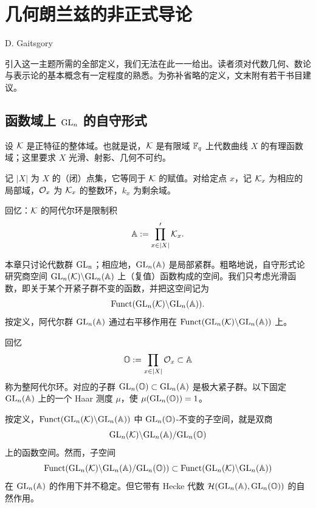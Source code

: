 \chapter{几何朗兰兹的非正式导论}\label{ch:12}

\begin{center}
D. Gaitsgory
\end{center}

\renewcommand{\thesection}{\arabic{section}}
\begingroup\let\thefootnote\relax{}\endgroup


引入这一主题所需的全部定义，我们无法在此一一给出。读者须对代数几何、数论与表示论的基本概念有一定程度的熟悉。为弥补省略的定义，文末附有若干书目建议。

\section{函数域上 $\mathrm{GL}_n$ 的自守形式}

设 $\mathcal{K}$ 是正特征的整体域。也就是说，$\mathcal{K}$ 是有限域 $\mathbb{F}_q$ 上代数曲线 $X$ 的有理函数域；这里要求 $X$ 光滑、射影、几何不可约。

记 $|X|$ 为 $X$ 的（闭）点集，它等同于 $\mathcal{K}$ 的赋值。对给定点 $x$，记 $\mathcal{K}_x$ 为相应的局部域，$\mathcal{O}_x$ 为 $\mathcal{K}_x$ 的整数环，$k_x$ 为剩余域。

回忆：$\mathcal{K}$ 的阿代尔环是限制积
\[
\mathbb{A}:=\prod_{x\in|X|}'\mathcal{K}_x .
\]

本章只讨论代数群 $\mathrm{GL}_n$；相应地，$\mathrm{GL}_n(\mathbb{A})$ 是局部紧群。粗略地说，自守形式论研究商空间 $\mathrm{GL}_n(\mathcal{K})\backslash\allowbreak\mathrm{GL}_n(\mathbb{A})$ 上（复值）函数构成的空间。我们只考虑光滑函数，即关于某个开紧子群不变的函数，并把这空间记为
\[
\operatorname{Funct}(\mathrm{GL}_n(\mathcal{K})\backslash\allowbreak\mathrm{GL}_n(\mathbb{A})).
\]
按定义，阿代尔群 $\mathrm{GL}_n(\mathbb{A})$ 通过右平移作用在 $\operatorname{Funct}(\mathrm{GL}_n(\mathcal{K})\backslash\allowbreak\mathrm{GL}_n(\mathbb{A}))$ 上。

回忆
\[
\mathbb{O}:=\prod_{x\in|X|}\mathcal{O}_x\subset\mathbb{A}
\]
称为整阿代尔环。对应的子群 $\mathrm{GL}_n(\mathbb{O})\subset\mathrm{GL}_n(\mathbb{A})$ 是极大紧子群。以下固定 $\mathrm{GL}_n(\mathbb{A})$ 上的一个 Haar 测度 $\mu$，使 $\mu(\mathrm{GL}_n(\mathbb{O}))=1$。

按定义，$\operatorname{Funct}(\mathrm{GL}_n(\mathcal{K})\backslash\allowbreak\mathrm{GL}_n(\mathbb{A}))$ 中 $\mathrm{GL}_n(\mathbb{O})$-不变的子空间，就是双商
\[
\mathrm{GL}_n(\mathcal{K})\backslash\allowbreak\mathrm{GL}_n(\mathbb{A})/\mathrm{GL}_n(\mathbb{O})
\]
上的函数空间。然而，子空间
\[
\operatorname{Funct}(\mathrm{GL}_n(\mathcal{K})\backslash\allowbreak\mathrm{GL}_n(\mathbb{A})/\mathrm{GL}_n(\mathbb{O}))\subset\operatorname{Funct}(\mathrm{GL}_n(\mathcal{K})\backslash\allowbreak\mathrm{GL}_n(\mathbb{A}))
\]
在 $\mathrm{GL}_n(\mathbb{A})$ 的作用下并不稳定。但它带有 Hecke 代数 $\mathcal{H}(\mathrm{GL}_n(\mathbb{A}),\mathrm{GL}_n(\mathbb{O}))$ 的自然作用。

